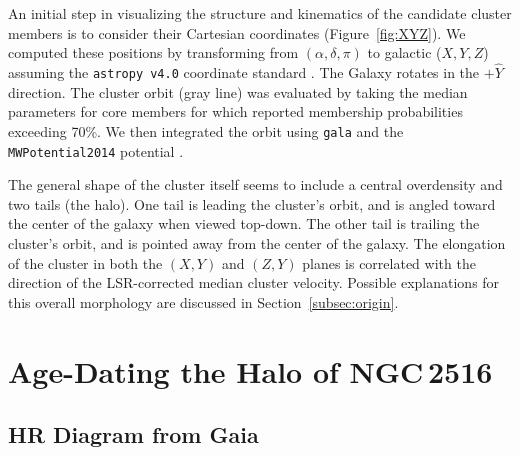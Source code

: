 \documentclass[12pt,twocolumn,tighten]{aastex63}
\begin{document}
An initial step in visualizing the structure and kinematics
of the candidate cluster members is to consider their Cartesian
coordinates (Figure~\ref{fig:XYZ}).  We computed these positions by
transforming from $(\alpha, \delta, \pi)$ to galactic ($X,Y,Z$)
assuming the \texttt{astropy v4.0} coordinate standard
\citep{astropy_2018}.  The Galaxy rotates in the
$+\hat{Y}$ direction. The cluster orbit (gray line) was evaluated by taking the
median parameters for core members for which
 reported membership probabilities
exceeding 70\%.  We then integrated the orbit using \texttt{gala} and
the \texttt{MWPotential2014} potential \citep{bovy_galpy_2015,gala}.

The general shape of the cluster itself seems to include a central
overdensity and two tails (the halo).  One tail is leading the
cluster's orbit, and is angled toward the center of the galaxy when
viewed top-down.  The other tail is trailing the cluster's orbit, and
is pointed away from the center of the galaxy.  The elongation of the
cluster in both the $(X,Y)$ and $(Z,Y)$ planes is correlated with the
direction of the LSR-corrected median cluster velocity.   Possible
explanations for this overall morphology are discussed in
Section~\ref{subsec:origin}.



\section{Age-Dating the Halo of NGC\,2516}
\label{sec:agedate}

\subsection{HR Diagram from Gaia}
\label{subsec:hr}
\end{document}
